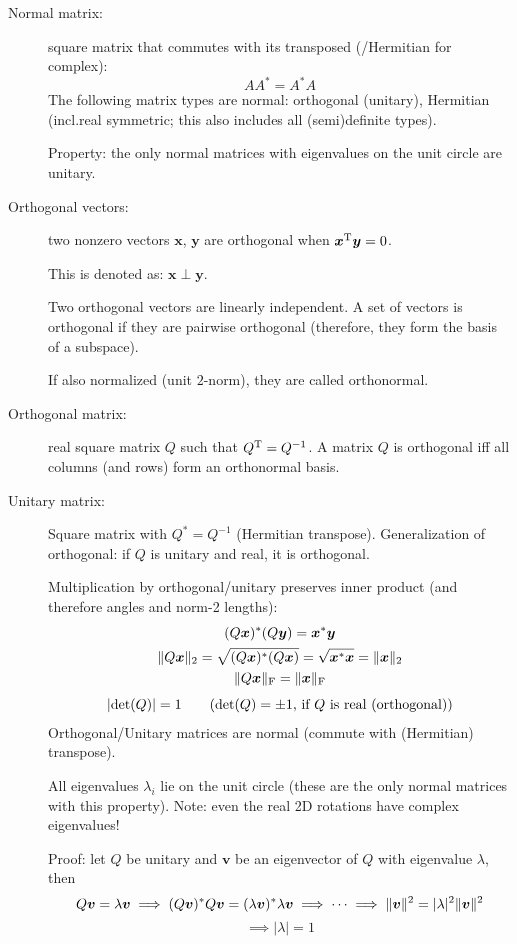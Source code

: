 \documentclass[
  12pt,
  paper=a4,
]{scrartcl} %
\begin{document}
\begin{description}
\item[Normal matrix:] square matrix that commutes with its transposed (/Hermitian for complex):
\[AA^* =A^*A\]
The following matrix types are normal: orthogonal (unitary), Hermitian (incl.\@ real symmetric; this also includes all (semi)definite types).

Property: the only normal matrices with eigenvalues on the unit circle are unitary.

\item[Orthogonal vectors:] two nonzero vectors $\bm x$, $\bm y$ are orthogonal when $\bm x^{\mathrm{T}} \bm y = 0$.

This is denoted as: $\bm x \perp \bm y$.

Two orthogonal vectors are linearly independent. A set of vectors is orthogonal if they are pairwise orthogonal (therefore, they form the basis of a subspace).

If also normalized (unit $2$-norm), they are called orthonormal.

\item[Orthogonal matrix:] real square matrix $Q$ such that $Q^{\mathrm{T}} = Q^{-1}$. A matrix $Q$ is orthogonal iff all columns (and rows) form an orthonormal basis.

\item[Unitary matrix:] Square matrix with $Q^*=Q^{-1}$ (Hermitian transpose). Generalization of orthogonal: if $Q$ is unitary and real, it is orthogonal.

Multiplication by orthogonal/unitary preserves inner product  (and therefore angles and norm-2 lengths):
\begin{gather*}
    (Q\bm x)^*(Q\bm y) = \bm x^*\bm y
\\    
\|Q\bm x\|_2 =
    \sqrt{(Q\bm x)^*(Q\bm x)} =
    \sqrt{\bm x^*\bm x} =
    \|\bm x\|_2
\\    
\|Q\bm x\|_{\text{F}} =
    \|\bm x\|_{\text{F}}
\\[4pt]
|{\det}(Q)| =1 \qquad \text{(${\det}(Q)=\pm 1$, if $Q$ is real (orthogonal))}
\end{gather*}
Orthogonal/Unitary matrices are normal (commute with (Hermitian) transpose).

All eigenvalues $\lambda_i$ lie on the unit circle (these are the only normal matrices with this property). Note: even the real 2D rotations have complex eigenvalues!

Proof: let $Q$ be unitary and $\bm v$ be an eigenvector of $Q$ with eigenvalue $\lambda$, then
\[
Q\bm v = \lambda \bm v\implies (Q\bm v)^*  Q\bm v = (\lambda \bm v)^* \lambda \bm v
\implies \cdots \implies \|\bm v\|^2 = |\lambda|^2 \|\bm v\|^2
\]
\[
\implies \boxed{|\lambda| = 1}
\]


\end{description}
\end{document}
